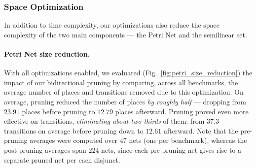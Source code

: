 \subsubsection{Space Optimization}

In addition to time complexity, our optimizations also reduce the space complexity of the two main components --- the Petri Net and the semilinear set.

\paragraph{Petri Net size reduction.}

With all optimizations enabled, we evaluated (Fig.~\ref{fig:petri_size_reduction}) the impact of our bidirectional pruning by comparing, across all benchmarks, the average number of places and transitions removed due to this optimization. On average, pruning reduced the number of places \textit{by roughly half} --- dropping from $23.91$ places before pruning to $12.79$ places afterward. Pruning proved even more effective on transitions, \textit{eliminating about two-thirds} of them: from $37.3$ transitions on average before pruning down to $12.61$ afterward. Note that the pre-pruning averages were computed over $47$ nets (one per benchmark), whereas the post-pruning averages span $224$ nets, since each pre-pruning net gives rise to a separate pruned net per each disjunct. 



